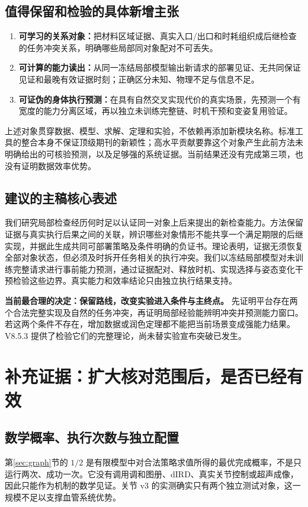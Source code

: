 \documentclass[11pt,a4paper,fontset=fandol]{ctexart}
\theoremstyle{definition}
\theoremstyle{remark}\newtheorem{remark}[theorem]{说明}
\numberwithin{equation}{section}
\begin{document}
\subsection{值得保留和检验的具体新增主张}
\begin{enumerate}
\item \textbf{可学习的关系对象：}把材料区域证据、真实入口/出口和时耗组织成后继检查的任务冲突关系，明确哪些局部同对象配对不可丢失。
\item \textbf{可计算的能力读出：}从同一冻结局部模型输出新请求的部署见证、无共同保证见证和最晚有效证据时刻；正确区分未知、物理不足与信息不足。
\item \textbf{可证伪的身体执行预测：}在具有自然交叉实现代价的真实场景，先预测一个有宽度的能力分离区域，再以独立未训练完整链、时机干预和变姿复用验证。
\end{enumerate}
上述对象贯穿数据、模型、求解、定理和实验，不依赖再添加新模块名称。标准工具的整合本身不保证顶级期刊的新颖性；高水平贡献要靠这个对象产生此前方法未明确给出的可核验预测，以及足够强的系统证据。当前结果还没有完成第三项，也没有证明数据效率优势。

\subsection{建议的主稿核心表述}
\begin{corebox}
我们研究局部检查经历何时足以认证同一对象上后来提出的新检查能力。方法保留证据与真实执行后果之间的关联，辨识哪些对象情形不能共享一个满足期限的后继实现，并据此生成共同可部署策略及条件明确的负证书。理论表明，证据无须恢复全部对象状态，但必须及时拆开任务相关的执行冲突。我们以冻结局部模型对未训练完整请求进行事前能力预测，通过证据配对、释放时机、实现选择与姿态变化干预检验这些边界。真实能力和效率结论只由独立执行结果支持。
\end{corebox}

\textbf{当前最合理的决定：保留路线，改变实验进入条件与主终点。} 先证明平台存在两个合法完整实现及自然的任务冲突，再证明局部经验能辨明冲突并预测能力窗口。若这两个条件不存在，增加数据或润色定理都不能把当前场景变成强能力结果。V8.5.3 提供了检验它们的完整理论，尚未替实验宣布突破已发生。

\section{补充证据：扩大核对范围后，是否已经有效}
\label{sec:graph_audit}
\subsection{数学概率、执行次数与独立配置}
第\ref{sec:graph}节的 $1/2$ 是有限模型中对合法策略求值所得的最优完成概率，不是只运行两次、成功一次。它没有调用调和图册、dIRD、真实关节控制或超声成像，因此只能作为机制的数学见证。关节 v3 的实测确实只有两个独立测试对象，这一规模不足以支撑血管系统优势。
\end{document}
